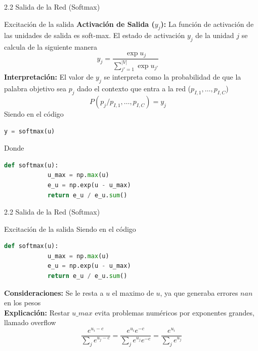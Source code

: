 \documentclass{beamer}
\begin{document}
	
\begin{frame}[fragile]{2.2 Salida de la Red (Softmax)}
	\begin{block}{Excitación de la salida}
		\justifying
		\textbf{ Activación de Salida ($y_j$):} La función de activación de las unidades de salida es soft-max. El estado de activación $y_j$ de la unidad $j$ se calcula de la siguiente manera\\
		$$y_j = \frac{\exp u_j}{\sum_{j'=1}^{|V|} \exp u_{j'}} \quad$$
		\vspace{0.3cm}
		\textbf{ Interpretación:} El valor de $y_j$ se interpreta como la probabilidad de que la palabra objetivo sea $p_j$ dado el contexto que entra a la red ($p_{I,1}, \dots, p_{I,C}$)\\
		$$P(p_j/p_{I,1}, \dots, p_{I,C}) = y_j \quad$$
		Siendo en el código
		\begin{lstlisting}[language=Python]
			y = softmax(u)
		\end{lstlisting}
		Donde 
				\begin{lstlisting}[language=Python]
		def softmax(u):
			u_max = np.max(u)
			e_u = np.exp(u - u_max)
			return e_u / e_u.sum()
		\end{lstlisting}
	\end{block}
\end{frame}
	
	
\begin{frame}[fragile]{2.2 Salida de la Red (Softmax)}
	\begin{block}{Excitación de la salida}
		\justifying
		Siendo en el código
		\begin{lstlisting}[language=Python]
			def softmax(u):
			u_max = np.max(u)
			e_u = np.exp(u - u_max)
			return e_u / e_u.sum()
		\end{lstlisting}
		\textbf{ Consideraciones:} Se le resta a $u$ el maximo de $u$, ya que generaba errores $nan$ en los pesos\\
		\vspace{0.2cm}
		\textbf{ Explicación:} Restar $u\_max$ evita problemas numéricos por exponentes grandes, llamado overflow\\
		\[
		\frac{e^{u_i - c}}{\sum_j e^{u_j - c}} 
		= \frac{e^{u_i} e^{-c}}{\sum_j e^{u_j} e^{-c}} 
		= \frac{e^{u_i}}{\sum_j e^{u_j}}
		\]

	\end{block}
\end{frame}
	
\end{document}
